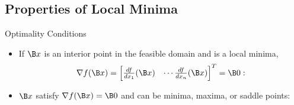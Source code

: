 \subsection{Properties of Local Minima}

\begin{frame}{Optimality Conditions}

\begin{itemize}
\item If $\B x$ is an interior point in the feasible domain and is a local minima, 
\[\nabla f(\B x) = \begin{bmatrix} \frac{df}{dx_1}(\B x) & \cdots \frac{df}{dx_n}(\B x)\end{bmatrix}^T = \B 0:\]

\item {} $\B x$ satisfy $\nabla f(\B x) = \B 0$ and can be minima, maxima, or saddle points:



\end{itemize}


\end{frame}

